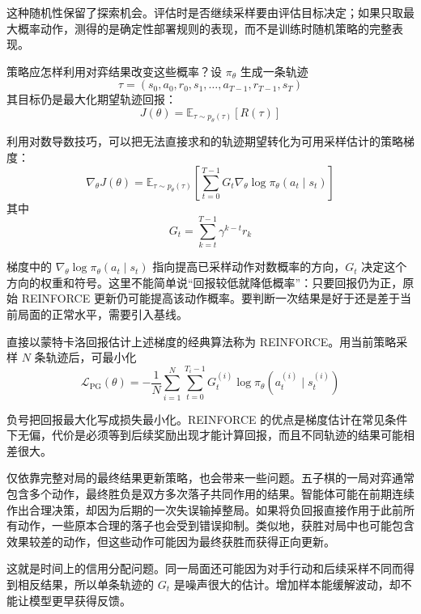 这种随机性保留了探索机会。评估时是否继续采样要由评估目标决定；如果只取最大概率动作，测得的是确定性部署规则的表现，而不是训练时随机策略的完整表现。

策略应怎样利用对弈结果改变这些概率？设 $\pi_\theta$ 生成一条轨迹
\begin{equation}
\tau
=
(s_0,a_0,r_0,s_1,\ldots,a_{T-1},r_{T-1},s_T)
\end{equation}
其目标仍是最大化期望轨迹回报：
\begin{equation}
J(\theta)
=
\mathbb{E}_{\tau\sim p_{\theta}(\tau)}
\left[
R(\tau)
\right]
\end{equation}

利用对数导数技巧，可以把无法直接求和的轨迹期望转化为可用采样估计的策略梯度：
\begin{equation}
\nabla_{\theta}J(\theta)
=
\mathbb{E}_{\tau\sim p_{\theta}(\tau)}
\left[
\sum_{t=0}^{T-1}
G_t
\nabla_{\theta}
\log\pi_{\theta}(a_t\mid s_t)
\right]
\end{equation}
其中
\begin{equation}
G_t
=
\sum_{k=t}^{T-1}
\gamma^{k-t}r_k
\end{equation}

梯度中的 $\nabla_\theta\log\pi_\theta(a_t\mid s_t)$ 指向提高已采样动作对数概率的方向，$G_t$ 决定这个方向的权重和符号。这里不能简单说“回报较低就降低概率”：只要回报仍为正，原始 REINFORCE 更新仍可能提高该动作概率。要判断一次结果是好于还是差于当前局面的正常水平，需要引入基线。

直接以蒙特卡洛回报估计上述梯度的经典算法称为 REINFORCE。用当前策略采样 $N$ 条轨迹后，可最小化
\begin{equation}
\mathcal{L}_{\mathrm{PG}}(\theta)
=
-
\frac{1}{N}
\sum_{i=1}^{N}
\sum_{t=0}^{T_i-1}
G_t^{(i)}
\log
\pi_{\theta}
\left(
a_t^{(i)}\mid s_t^{(i)}
\right)
\end{equation}

负号把回报最大化写成损失最小化。REINFORCE 的优点是梯度估计在常见条件下无偏，代价是必须等到后续奖励出现才能计算回报，而且不同轨迹的结果可能相差很大。

仅依靠完整对局的最终结果更新策略，也会带来一些问题。五子棋的一局对弈通常包含多个动作，最终胜负是双方多次落子共同作用的结果。智能体可能在前期连续作出合理决策，却因为后期的一次失误输掉整局。如果将负回报直接作用于此前所有动作，一些原本合理的落子也会受到错误抑制。类似地，获胜对局中也可能包含效果较差的动作，但这些动作可能因为最终获胜而获得正向更新。

这就是时间上的信用分配问题。同一局面还可能因为对手行动和后续采样不同而得到相反结果，所以单条轨迹的 $G_t$ 是噪声很大的估计。增加样本能缓解波动，却不能让模型更早获得反馈。

